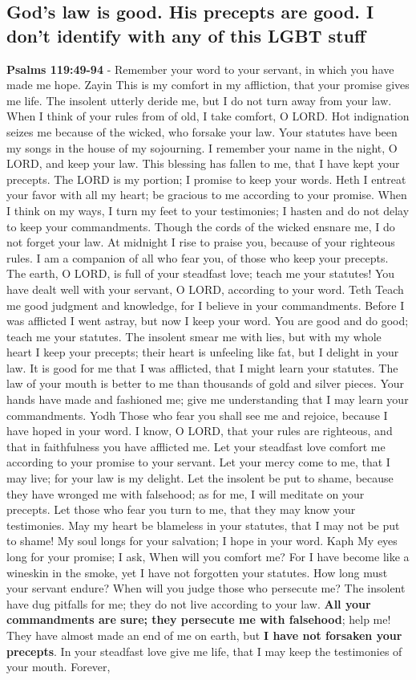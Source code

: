 \documentclass[11pt]{article}
\begin{document}
\subsection{God's law is good. His precepts are good. I don't identify with any of this LGBT stuff}
\label{sec:org64537a3}
\textbf{Psalms 119:49-94} - Remember your word to your servant, in which you have made me hope. Zayin This is my comfort in my affliction, that your promise gives me life. The insolent utterly deride me, but I do not turn away from your law. When I think of your rules from of old, I take comfort, O LORD. Hot indignation seizes me because of the wicked, who forsake your law. Your statutes have been my songs in the house of my sojourning. I remember your name in the night, O LORD, and keep your law. This blessing has fallen to me, that I have kept your precepts. The LORD is my portion; I promise to keep your words. Heth I entreat your favor with all my heart; be gracious to me according to your promise. When I think on my ways, I turn my feet to your testimonies; I hasten and do not delay to keep your commandments. Though the cords of the wicked ensnare me, I do not forget your law. At midnight I rise to praise you, because of your righteous rules. I am a companion of all who fear you, of those who keep your precepts. The earth, O LORD, is full of your steadfast love; teach me your statutes! You have dealt well with your servant, O LORD, according to your word. Teth Teach me good judgment and knowledge, for I believe in your commandments. Before I was afflicted I went astray, but now I keep your word. You are good and do good; teach me your statutes. The insolent smear me with lies, but with my whole heart I keep your precepts; their heart is unfeeling like fat, but I delight in your law. It is good for me that I was afflicted, that I might learn your statutes. The law of your mouth is better to me than thousands of gold and silver pieces. Your hands have made and fashioned me; give me understanding that I may learn your commandments. Yodh Those who fear you shall see me and rejoice, because I have hoped in your word. I know, O LORD, that your rules are righteous, and that in faithfulness you have afflicted me. Let your steadfast love comfort me according to your promise to your servant. Let your mercy come to me, that I may live; for your law is my delight. Let the insolent be put to shame, because they have wronged me with falsehood; as for me, I will meditate on your precepts. Let those who fear you turn to me, that they may know your testimonies. May my heart be blameless in your statutes, that I may not be put to shame! My soul longs for your salvation; I hope in your word. Kaph My eyes long for your promise; I ask, When will you comfort me? For I have become like a wineskin in the smoke, yet I have not forgotten your statutes. How long must your servant endure? When will you judge those who persecute me? The insolent have dug pitfalls for me; they do not live according to your law. \textbf{All your commandments are sure; they persecute me with falsehood}; help me! They have almost made an end of me on earth, but \textbf{I have not forsaken your precepts}. In your steadfast love give me life, that I may keep the testimonies of your mouth. Forever, 
\end{document}
